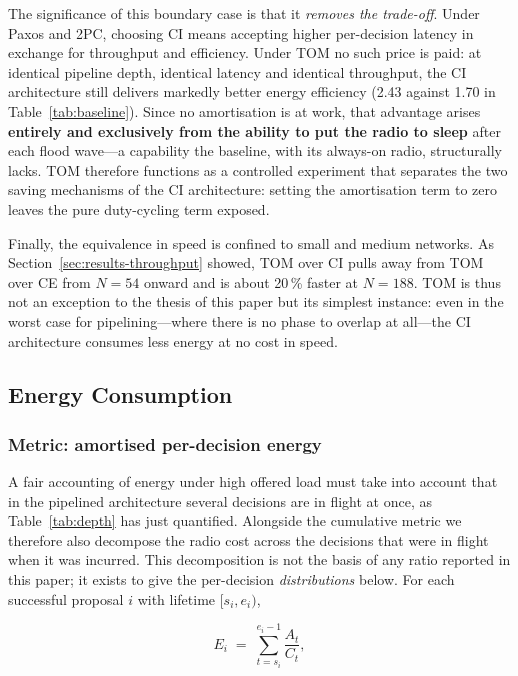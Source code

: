 \documentclass[journal]{IEEEtran}
\newcommand{\CI}{CI}                      %
\newcommand{\CE}{CE}                      %
\newcommand{\Nnodes}{N}                   %
\begin{document}
The significance of this boundary case is that it \emph{removes the
trade-off}. Under Paxos and 2PC, choosing \CI{} means accepting higher
per-decision latency in exchange for throughput and efficiency. Under TOM
no such price is paid: at identical pipeline depth, identical latency and
identical throughput, the \CI{} architecture still delivers markedly
better energy efficiency (2.43 against 1.70 in
Table~\ref{tab:baseline}). Since no amortisation is at work, that
advantage arises \textbf{entirely and exclusively from the ability to put
the radio to sleep} after each flood wave---a capability the baseline,
with its always-on radio, structurally lacks. TOM therefore functions as a
controlled experiment that separates the two saving mechanisms of the
\CI{} architecture: setting the amortisation term to zero leaves the pure
duty-cycling term exposed.

Finally, the equivalence in speed is confined to small and medium
networks. As Section~\ref{sec:results-throughput} showed, TOM over \CI{}
pulls away from TOM over \CE{} from $\Nnodes = 54$ onward and is about
20\,\% faster at $\Nnodes = 188$. TOM is thus not an exception to the
thesis of this paper but its simplest instance: even in the worst case for
pipelining---where there is no phase to overlap at all---the \CI{}
architecture consumes less energy at no cost in speed.

\subsection{Energy Consumption}
\label{sec:results-energy}

\subsubsection{Metric: amortised per-decision energy}

A fair accounting of energy under high offered load must take into account
that in the pipelined architecture several decisions are in flight at
once, as Table~\ref{tab:depth} has just quantified. Alongside the cumulative
metric we therefore also decompose the radio cost across the decisions that
were in flight when it was incurred. This decomposition is not the basis of
any ratio reported in this paper; it exists to give the per-decision
\emph{distributions} below. For each
successful proposal $i$ with lifetime $[s_i, e_i)$,

\begin{equation}
\label{eq:amortized}
E_i \;=\; \sum_{t=s_i}^{e_i-1} \frac{A_t}{C_t} ,
\end{equation}
\end{document}
